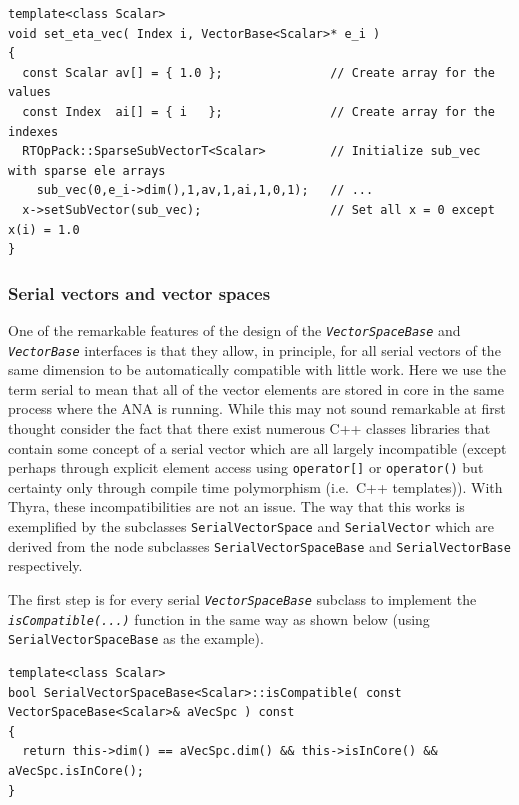 \documentclass[pdf,ps2pdf,11pt]{SANDreport}
\begin{document}
{\scriptsize\begin{verbatim}
template<class Scalar>
void set_eta_vec( Index i, VectorBase<Scalar>* e_i )
{
  const Scalar av[] = { 1.0 };               // Create array for the values
  const Index  ai[] = { i   };               // Create array for the indexes
  RTOpPack::SparseSubVectorT<Scalar>         // Initialize sub_vec with sparse ele arrays
    sub_vec(0,e_i->dim(),1,av,1,ai,1,0,1);   // ...
  x->setSubVector(sub_vec);                  // Set all x = 0 except x(i) = 1.0
}
\end{verbatim}}

%
\subsubsection{Serial vectors and vector spaces}
\label{tsfcore:sec:serial_vecs}
%

One of the remarkable features of the design of the
{}\texttt{\textit{Vector\-Space\-Base}} and {}\texttt{\textit{Vector\-Base}}
interfaces is that they allow, in principle, for all serial vectors of
the same dimension to be automatically compatible with little work.
Here we use the term serial to mean that all of the vector elements
are stored in core in the same process where the ANA is running.
While this may not sound remarkable at first thought consider the fact
that there exist numerous C++ classes libraries that contain some
concept of a serial vector {}\cite{ref:lumsdaine_and_siek_1998,
ref:tnt, ref:roberts_et_al_1996, ref:math++_1996} which are all
largely incompatible (except perhaps through explicit element access
using {}\texttt{operator[]} or {}\texttt{operator()} but certainty
only through compile time polymorphism (i.e.~C++ templates)).  With
Thyra, these incompatibilities are not an issue.  The way that this
works is exemplified by the subclasses {}\texttt{SerialVectorSpace}
and {}\texttt{SerialVector} which are derived from the node subclasses
{}\texttt{Serial\-VectorSpace\-Base} and {}\texttt{SerialVectorBase}
respectively.

The first step is for every serial {}\texttt{\textit{Vector\-Space\-Base}}
subclass to implement the {}\texttt{\textit{isCompatible(\-...)}}
function in the same way as shown below (using
{}\texttt{SerialVectorSpaceBase} as the example).

{\scriptsize\begin{verbatim}
template<class Scalar>
bool SerialVectorSpaceBase<Scalar>::isCompatible( const VectorSpaceBase<Scalar>& aVecSpc ) const
{
  return this->dim() == aVecSpc.dim() && this->isInCore() && aVecSpc.isInCore();
}
\end{verbatim}}
\end{document}
